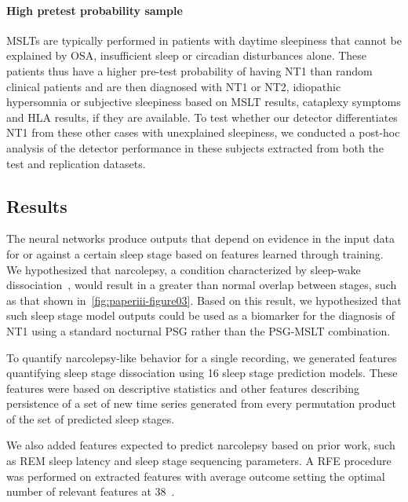 \paragraph{High pretest probability sample}
\Acp{MSLT} are typically performed in patients with daytime sleepiness that cannot be explained by \ac{OSA}, insufficient sleep or circadian disturbances alone. 
These patients thus have a higher pre-test probability of having \ac{NT1} than random clinical patients and are then diagnosed with \ac{NT1} or \ac{NT2}, idiopathic hypersomnia or subjective sleepiness based on \ac{MSLT} results, cataplexy symptoms and \ac{HLA} results, if they are available.
To test whether our detector differentiates \ac{NT1} from these other cases with unexplained sleepiness, we conducted a post-hoc analysis of the detector performance in these subjects extracted from both the test and replication datasets.

\subsection{Results}

The neural networks produce outputs that depend on evidence in the input data for or against a certain sleep stage based on features learned through training.
We hypothesized that narcolepsy, a condition characterized by sleep-wake dissociation~\cite{Christensen2015a,Olsen2017,Jensen2014,Vassalli2013,Pizza2015}, would result in a greater than normal overlap between stages, such as that shown in~\cref{fig:paperiii-figure03}.
Based on this result, we hypothesized that such sleep stage model outputs could be used as a biomarker for the diagnosis of \ac{NT1} using a standard nocturnal \ac{PSG} rather than the \ac{PSG}-\ac{MSLT} combination.

To quantify narcolepsy-like behavior for a single recording, we generated features quantifying sleep stage dissociation using 16 sleep stage prediction models. 
These features were based on descriptive statistics and other features describing persistence of a set of new time series generated from every permutation product of the set of predicted sleep stages.

We also added features expected to predict narcolepsy based on prior work, such as \ac{REM} sleep latency and sleep stage sequencing parameters. 
A \ac{RFE} procedure was performed on extracted features with average outcome setting the optimal number of relevant features at 38~\cite{Guyon2002}. 

